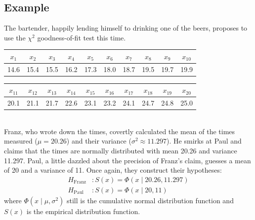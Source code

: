 \documentclass{article}
\begin{document}
\subsection{Example}

The bartender, happily lending himself to drinking one of the beers, proposes to use the $\chi^2$ goodness-of-fit test this time.
%
\begin{table}[h]
\center
\begin{tabular}{cccccccccc}
$x_1$	&$x_2$	&$x_3$	&$x_4$	&$x_5$	&$x_6$	&$x_7$	&$x_8$	&$x_9$	&$x_{10}$\\
\hline
14.6	&15.4	&15.5	&16.2	&17.3	&18.0	&18.7	&19.5	&19.7	&19.9	\\
\end{tabular}
\begin{tabular}{cccccccccc}
$x_{11}$	&$x_{12}$	&$x_{13}$	&$x_{14}$	&$x_{15}$	&$x_{16}$	&$x_{17}$	&$x_{18}$	&$x_{19}$	&$x_{20}$\\
\hline
20.1	&21.1	&21.7	&22.6	&23.1	&23.2	&24.1	&24.7	&24.8	&25.0	\\
\end{tabular}
\end{table}
\\
Franz, who wrote down the times, covertly calculated the mean of the times measured ($\mu = 20.26$) and their variance ($\sigma^2 \approx 11.297$).
He smirks at Paul and claims that the times are normally distributed with mean 20.26 and variance 11.297.
Paul, a little dazzled about the precision of Franz's claim, guesses a mean of 20 and a variance of 11.
Once again, they construct their hypotheses:
\begin{align*}
	H_{\text{Franz}} &: S(x) = \Phi(x\mid 20.26, 11.297)
	\\
	H_{\text{Paul}} &: S(x) = \Phi(x\mid 20, 11)
\end{align*}
where $\Phi(x\mid\mu,\sigma^2)$ still is the cumulative normal distribution function and $S(x)$ is the empirical distribution function.
\end{document}
